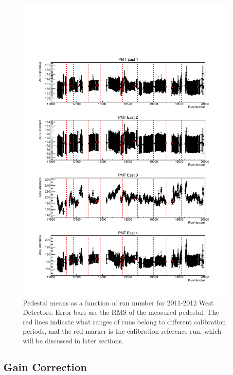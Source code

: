 \begin{figure}[p] 
\centering
\includegraphics[page=2,scale=0.8]{3-UCNAAnalysis/2011-2012_pedestals.pdf}
\caption{Pedestal means as a function of run number for 2011-2012 West Detectors. Error bars are the
  RMS of the measured pedestal. The red lines indicate what ranges of runs belong to
  different calibration periods, and the red marker is the calibration reference run,
  which will be discussed in later sections.}
\label{fig:peds_timeDep}
\end{figure}

\subsection{Gain Correction}

